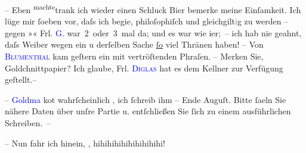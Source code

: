 \pstart
           {\pb}– Eben \substVorne{}\textsuperscript{machte}{\allowbreak}\substDazwischen{}trank\substHinten{} ich wieder einen Schluck Bier {\kaufmannsund} bemerke meine
               Einſamkeit. Ich lüge mir ſoeben vor, daſs ich begi{\geminationn}e,
               philoſophiſch und gleichgilt\textcolor{gray}{i}g zu werden – gegen »\label{K_L02960-5v}\label{K_L02960-5h}« Frl. \textcolor{blue}{G.}{}\ledrightnote{\textcolor{blue}{Marie Glümer}} war 2 oder 3 mal da; und es war wie i{\geminationm}er; – ich hab nie geahnt, daſs Weiber wegen ein u
               derſelben Sache \uline{ſo}{ }{\pb}viel Thränen haben! – Von \textsc{\textcolor{blue}{Blumenthal}{}\ledrightnote{\textcolor{blue}{Oskar Blumenthal}}} kam geſtern ein \label{K_L02960-6v}\label{K_L02960-6h} mit vertröſtenden Phraſen. – Merken Sie, Goldchnittpapier? Ich glaube, Frl.
                  \textsc{\textcolor{blue}{Diglas}{}\ledrightnote{\textcolor{blue}{Antonie Cuny-Pierron}}} hat es dem Kellner zur Verfügung geſtellt.– \pend
           
\pstart
           – \textcolor{blue}{Goldma{\geminationn}}{}\ledrightnote{\textcolor{blue}{Paul Goldmann}} ko{\geminationm}t wahrſcheinlich \label{K_L02960-7v}\label{K_L02960-7h}, ich ſchreib ihm – Ende {\pb}Auguſt. Bitte ſa{\geminationm}eln Sie
               nähere Daten über unſre Partie u. entſchließen Sie ſich zu einem ausführlichen
               Schreiben. –\pend
           
\pstart
           – Nun fahr ich hinein, \label{K_L02960-8v}\label{K_L02960-8h}, hihihihihihihihihihi!\pend
           
